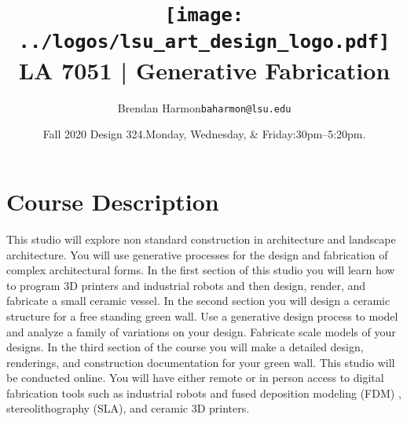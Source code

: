 \documentclass[11pt,article,oneside]{memoir}
\makeatletter
\def\myauthor{Author}
\def\mytitle{Title}
\def\myemail{baharmon@lsu.edu}
\def\myauthor{Brendan Harmon}
\def\mytitle{ \texttt{[image: ../logos/lsu\_art\_design\_logo.pdf]} \\[0.1cm] {\normalfont \normalsize LA 7051 |} \Large Generative Fabrication}
\newcommand{\globalcolor}[1]{%
  \color{#1}\global\let\default@color\current@color
}
\makeatother
\begin{document}
\setlength\bibitemsep{0.5em}

\setmainfont{Lato Regular}
\setmonofont[Scale=0.8]{IBM Plex Mono}

\def\ind{\hangindent=1 true cm\hangafter=1 \noindent}
\def\labelitemi{$\cdot$}

\title{\LARGE \mytitle}
\author{\Large\myauthor \newline \footnotesize\texttt{\noindent\myemail}}
\date{Fall 2020 Design 324.\newline Monday, Wednesday, \& Friday:30pm--5:20pm.}
\published{\,}


\globalcolor{black}
\vspace*{-10em}
\maketitle
{}
\clearpage


\globalcolor{black}
\vspace*{-10em}
\maketitle

\section{Course Description}

This studio will explore non standard construction 
in architecture and landscape architecture.
You will use generative processes 
for the design and fabrication 
of complex architectural forms. 
In the first section of this studio you will 
learn how to program 3D printers and industrial robots 
and then design, render, and fabricate 
a small ceramic vessel.  
In the second section you will design 
a ceramic structure for a free standing green wall.
Use a generative design process to model 
and analyze a family of variations on your design.
Fabricate scale models of your designs.  
In the third section of the course 
you will make a detailed design, renderings,  
and construction documentation
for your green wall. 
This studio will be conducted online. 
You will have either remote or in person access 
to digital fabrication tools
such as industrial robots and 
fused deposition modeling (FDM) ,
stereolithography (SLA), and ceramic 3D printers.\\
\end{document}
